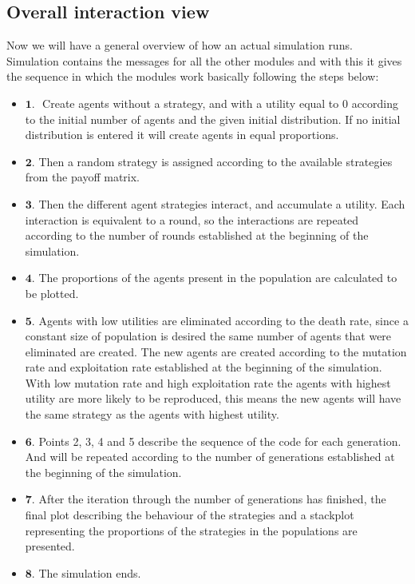 \newpage
\subsection{Overall interaction view}
Now we will have a general overview of how an actual simulation runs. Simulation contains the messages for all the other modules and with this it gives the sequence in which the modules work basically following the steps below:

\begin{itemize}
   \item $\textbf{1. }$ Create agents without a strategy, and with a utility equal to 0 according to the initial number of agents and the given initial distribution. If no initial distribution is entered it will create agents in equal proportions. 
   \item $\textbf{2. }$Then a random strategy is assigned according to the available strategies from the payoff matrix.
   \item $\textbf{3. }$Then the different agent strategies interact, and accumulate a utility. Each interaction is equivalent to a round, so the interactions are repeated according to the number of rounds established at the beginning of the simulation.
   \item $\textbf{4. }$The proportions of the agents present in the population are calculated to be plotted.
   \item $\textbf{5. }$Agents with low utilities are eliminated according to the death rate, since a constant size of population is desired  the same number of agents that were eliminated are created. The new agents are created according to the mutation rate and exploitation rate established at the beginning of the simulation. With low mutation rate and high exploitation rate the agents with highest utility are more likely to be reproduced, this means the new agents will have the same strategy as the agents with highest utility.
   \item $\textbf{6. }$Points 2, 3, 4 and 5 describe the sequence of the code for each generation. And will be repeated according to the number of generations established at the beginning of the simulation.
   \item $\textbf{7. }$After the iteration through the number of generations has finished, the final plot describing the behaviour of the strategies and a stackplot representing the proportions of the strategies in the populations are presented.
   \item $\textbf{8. }$The simulation ends.
\end{itemize}


